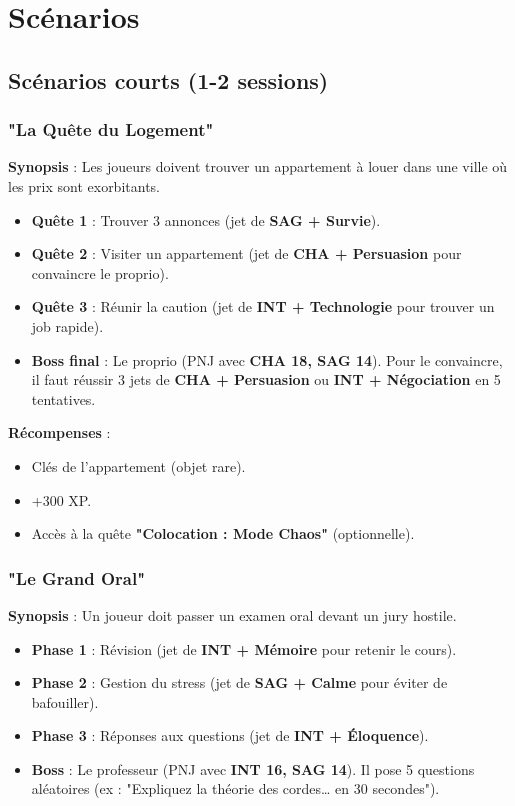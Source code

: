 \documentclass[11pt, a4paper]{article}
\begin{document}
\newpage
\section{Scénarios}

\subsection{Scénarios courts (1-2 sessions)}
\subsubsection{"La Quête du Logement"}
\textbf{Synopsis} : Les joueurs doivent trouver un appartement à louer dans une ville où les prix sont exorbitants.

\begin{itemize}
    \item \textbf{Quête 1} : Trouver 3 annonces (jet de \textbf{SAG + Survie}).
    \item \textbf{Quête 2} : Visiter un appartement (jet de \textbf{CHA + Persuasion} pour convaincre le proprio).
    \item \textbf{Quête 3} : Réunir la caution (jet de \textbf{INT + Technologie} pour trouver un job rapide).
    \item \textbf{Boss final} : Le proprio (PNJ avec \textbf{CHA 18, SAG 14}). Pour le convaincre, il faut réussir 3 jets de \textbf{CHA + Persuasion} ou \textbf{INT + Négociation} en 5 tentatives.
\end{itemize}

\textbf{Récompenses} :
\begin{itemize}
    \item Clés de l'appartement (objet rare).
    \item +300 XP.
    \item Accès à la quête \textbf{"Colocation : Mode Chaos"} (optionnelle).
\end{itemize}

\subsubsection{"Le Grand Oral"}
\textbf{Synopsis} : Un joueur doit passer un examen oral devant un jury hostile.

\begin{itemize}
    \item \textbf{Phase 1} : Révision (jet de \textbf{INT + Mémoire} pour retenir le cours).
    \item \textbf{Phase 2} : Gestion du stress (jet de \textbf{SAG + Calme} pour éviter de bafouiller).
    \item \textbf{Phase 3} : Réponses aux questions (jet de \textbf{INT + Éloquence}).
    \item \textbf{Boss} : Le professeur (PNJ avec \textbf{INT 16, SAG 14}). Il pose 5 questions aléatoires (ex : "Expliquez la théorie des cordes… en 30 secondes").
\end{itemize}
\end{document}
